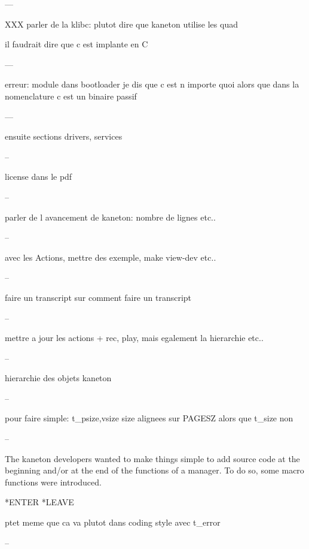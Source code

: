 ---

XXX parler de la klibc: plutot dire que kaneton utilise les quad

il faudrait dire que c est implante en C

---

erreur: module dans bootloader je dis que c est n importe quoi alors
 que dans la nomenclature c est un binaire passif

---

ensuite sections drivers, services

--

license dans le pdf

--

parler de l avancement de kaneton: nombre de lignes etc..

--

avec les Actions, mettre des exemple, make view-dev etc..

--

faire un transcript sur comment faire un transcript

--

mettre a jour les actions + rec, play, mais egalement la hierarchie etc..

--

hierarchie des objets kaneton

--

pour faire simple: t_{psize,vsize} size alignees sur PAGESZ alors
 que t_size non

--

The kaneton developers wanted to make things simple to add source code
at the beginning and/or at the end of the functions of a manager. To do
so, some macro functions were introduced.

*ENTER *LEAVE

ptet meme que ca va plutot dans coding style avec t_error

--
